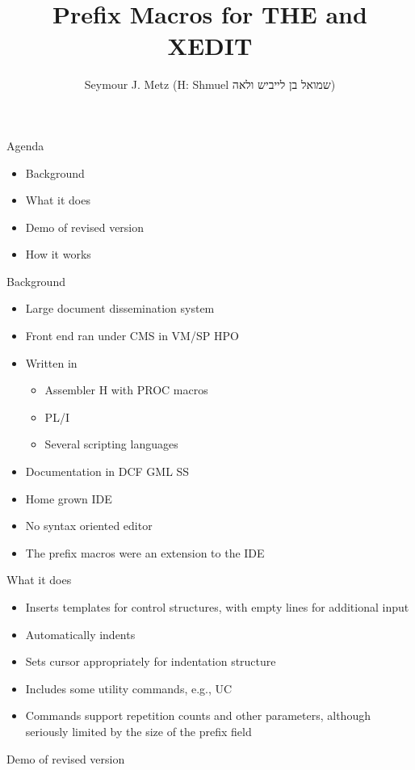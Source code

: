 \documentclass[11pt]{beamer}
\title{Prefix Macros for THE and XEDIT}
\author{Seymour J. Metz (H: Shmuel \texorpdfstring{{\hebrewfont\beginR שמואל בן לייביש ולאה\endR}}{שמואל בן לייביש ולאה})}
\institute{\href{mailto:smetz3@gmu.edu}{smetz3@gmu.edu} \\ \url{http://mason.gmu.edu/~smetz3}}
\date{}
\begin{document}
\begin{frame}
\titlepage
\end{frame}

\begin{frame}{Agenda}
\begin{itemize}
\item Background
\item What it does
\item Demo of revised version
\item How it works
\end{itemize}
\end{frame}

\begin{frame}{Background}
\begin{itemize}
\item Large document dissemination system
\item Front end ran under CMS in VM/SP HPO
\item Written in
  \begin{itemize}
  \item Assembler H with PROC macros
  \item PL/I
  \item Several scripting languages
  \end{itemize}
\item Documentation in DCF GML SS
\item Home grown IDE
\item No syntax oriented editor
\item The prefix macros were an extension to the IDE
\end{itemize}
\end{frame}

\begin{frame}{What it does}
\begin{itemize}
\item Inserts templates for control structures, with empty lines for additional input
\item Automatically indents
\item Sets cursor appropriately for indentation structure
\item Includes some utility commands, e.g., UC
\item Commands support repetition counts and other parameters, although seriously limited by the size of the prefix field
\end{itemize}
\end{frame}

\begin{frame}{Demo of revised version}
\end{frame}
\end{document}
